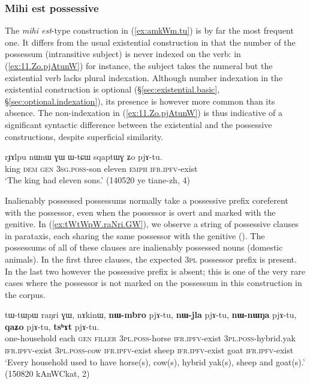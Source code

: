   
 \subsubsection{Mihi est possessive} \label{sec:possessive.mihi.est}
The \textit{mihi est}-type construction in (\ref{ex:amkWm.tu}) is by far the most frequent one.  It differs from the usual existential construction in that the number of the possessum (intransitive subject) is never indexed on the verb: in (\ref{ex:11.Zo.pjAtunW}) for instance, the subject  takes the numeral  but the existential verb  lacks plural indexation. Although number indexation in the existential construction is optional (§\ref{sec:existential.basic}, §\ref{sec:optional.indexation}), its presence is however more common than its absence. The non-indexation in (\ref{ex:11.Zo.pjAtunW}) is thus indicative of a significant syntactic difference between the existential and the possessive constructions, despite superficial similarity.
  
\begin{exe}
\ex \label{ex:11.Zo.pjAtunW}
\gll   rɟɤlpu nɯnɯ ɣɯ ɯ-tɕɯ sqaptɯɣ ʑo pjɤ-tu. \\
king \textsc{dem} \textsc{gen}  \textsc{3sg}.\textsc{poss}-son eleven \textsc{emph} \textsc{ifr}.\textsc{ipfv}-exist  \\
\glt `The king had eleven sons.' (140520 ye tiane-zh, 4)
 \end{exe}
 
Inalienably possessed possessums normally take a possessive prefix coreferent with the possessor, even when the possessor is overt and marked with the genitive. In (\ref{ex:tWtWpW.raNri.GW}), we observe a string of possessive clauses in parataxis, each sharing the same possessor with the genitive (). The possessums of all of these clauses are inalienably possessed nouns (domestic animals). In the first three clauses, the expected \textsc{3pl} possessor prefix is present. In the last two however the possessive prefix is absent; this is one of the very rare cases where the possessor is not marked on the possessum in this construction in the corpus.
 
 \begin{exe}
\ex \label{ex:tWtWpW.raNri.GW}
\gll tɯ-tɯpɯ raŋri ɣɯ, nɤkinɯ, \textbf{nɯ-mbro} pjɤ-tu, \textbf{nɯ-jla} pjɤ-tu, \textbf{nɯ-nɯŋa} pjɤ-tu, \textbf{qaʑo} pjɤ-tu, \textbf{tsʰɤt} pjɤ-tu. \\
one-household each \textsc{gen} \textsc{filler} \textsc{3pl}.\textsc{poss}-horse \textsc{ifr}.\textsc{ipfv}-exist 
\textsc{3pl}.\textsc{poss}-hybrid.yak \textsc{ifr}.\textsc{ipfv}-exist \textsc{3pl}.\textsc{poss}-cow \textsc{ifr}.\textsc{ipfv}-exist sheep  \textsc{ifr}.\textsc{ipfv}-exist  goat  \textsc{ifr}.\textsc{ipfv}-exist  \\
\glt `Every household used to have horse(s), cow(s), hybrid yak(s), sheep and goat(s).' (150820 kAnWCkat, 2)
 \end{exe}
 
